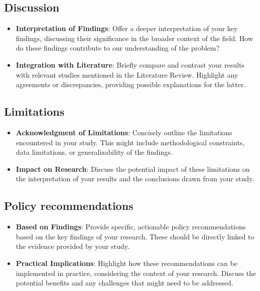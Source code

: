 \documentclass[
  12pt,
]{article}
\begin{document}
\subsection{Discussion}\label{discussion}

\begin{itemize}
\item
  \textbf{Interpretation of Findings}: Offer a deeper interpretation of
  your key findings, discussing their significance in the broader
  context of the field. How do these findings contribute to our
  understanding of the problem?
\item
  \textbf{Integration with Literature}: Briefly compare and contrast
  your results with relevant studies mentioned in the Literature Review.
  Highlight any agreements or discrepancies, providing possible
  explanations for the latter.
\end{itemize}

\subsection{Limitations}\label{limitations}

\begin{itemize}
\item
  \textbf{Acknowledgment of Limitations}: Concisely outline the
  limitations encountered in your study. This might include
  methodological constraints, data limitations, or generalizability of
  the findings.
\item
  \textbf{Impact on Research}: Discuss the potential impact of these
  limitations on the interpretation of your results and the conclusions
  drawn from your study.
\end{itemize}

\subsection{Policy recommendations}\label{policy-recommendations}

\begin{itemize}
\item
  \textbf{Based on Findings}: Provide specific, actionable policy
  recommendations based on the key findings of your research. These
  should be directly linked to the evidence provided by your study.
\item
  \textbf{Practical Implications}: Highlight how these recommendations
  can be implemented in practice, considering the context of your
  research. Discuss the potential benefits and any challenges that might
  need to be addressed.
\end{itemize}
\end{document}
